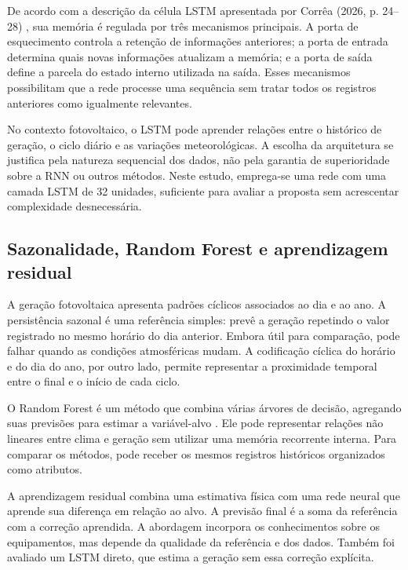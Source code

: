 De acordo com a descrição da célula LSTM apresentada por Corrêa (2026, p. 24--28) \cite{correa}, sua memória é regulada por três mecanismos principais. A porta de esquecimento controla a retenção de informações anteriores; a porta de entrada determina quais novas informações atualizam a memória; e a porta de saída define a parcela do estado interno utilizada na saída. Esses mecanismos possibilitam que a rede processe uma sequência sem tratar todos os registros anteriores como igualmente relevantes.

No contexto fotovoltaico, o LSTM pode aprender relações entre o histórico de geração, o ciclo diário e as variações meteorológicas. A escolha da arquitetura se justifica pela natureza sequencial dos dados, não pela garantia de superioridade sobre a RNN ou outros métodos. Neste estudo, emprega-se uma rede com uma camada LSTM de 32 unidades, suficiente para avaliar a proposta sem acrescentar complexidade desnecessária.

\subsection{Sazonalidade, Random Forest e aprendizagem residual}
A geração fotovoltaica apresenta padrões cíclicos associados ao dia e ao ano. A persistência sazonal é uma referência simples: prevê a geração repetindo o valor registrado no mesmo horário do dia anterior. Embora útil para comparação, pode falhar quando as condições atmosféricas mudam. A codificação cíclica do horário e do dia do ano, por outro lado, permite representar a proximidade temporal entre o final e o início de cada ciclo.

O Random Forest é um método que combina várias árvores de decisão, agregando suas previsões para estimar a variável-alvo \cite{rf}. Ele pode representar relações não lineares entre clima e geração sem utilizar uma memória recorrente interna. Para comparar os métodos, pode receber os mesmos registros históricos organizados como atributos.

A aprendizagem residual combina uma estimativa física com uma rede neural que aprende sua diferença em relação ao alvo. A previsão final é a soma da referência com a correção aprendida. A abordagem incorpora os conhecimentos sobre os equipamentos, mas depende da qualidade da referência e dos dados. Também foi avaliado um LSTM direto, que estima a geração sem essa correção explícita.